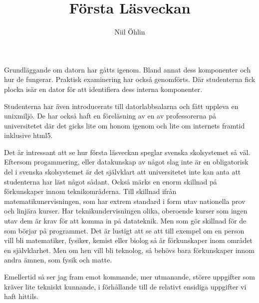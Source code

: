 \documentclass{article}
\begin{document}
\title{Första Läsveckan}
\author{Niil Öhlin}
\date{}
\maketitle

Grundläggande om datorn har gåtts igenom. Bland annat dess komponenter och hur
de fungerar. Praktisk examinering har också genomförts. Där studenterna
fick plocka isär en dator för att identifiera dess interna komponenter.

Studenterna har även introducerats till datorlabbsalarna och fått uppleva en
unixmiljö. De har också haft en föreläsning av en av professorerna på
universitetet där det gicks lite om honom igenom och lite om internets framtid
inklusive html5.

Det är intressant att se hur första läsveckan speglar svenska skolsystemet så
väl.
Eftersom progammering, eller datakunskap av något slag inte är en obligatorisk
del i svenska skolsystemet är det självklart att universitetet inte kan anta att
studenterna har läst något sådant. Också märks en enorm skillnad på förkunskaper
innom teknikområderna. Till skillnad ifrån matematikunervisningen, som har
extrem standard i form utav nationella prov och linjära kurser. Har
teknikundervisningen olika, oberoende kurser som ingen utav dem är krav för
att komma in på datateknik. Men som gör skillnad för de som börjar på
programmet. Det är lustigt att se att till exempel om en person vill
bli matematiker, fysiker, kemist eller biolog så är förkunskaper
inom området en självklarhet. Men om hen vill bli teknolog, så behövs bara
förkunskaper innom andra ämnen, som fysik och matte.

Emellertid så ser jag fram emot kommande, mer utmanande, större uppgifter
som kräver lite tekniskt kunnande, i förhållande till de relativt ensidiga
uppgifter vi haft hittils.
\end{document}
